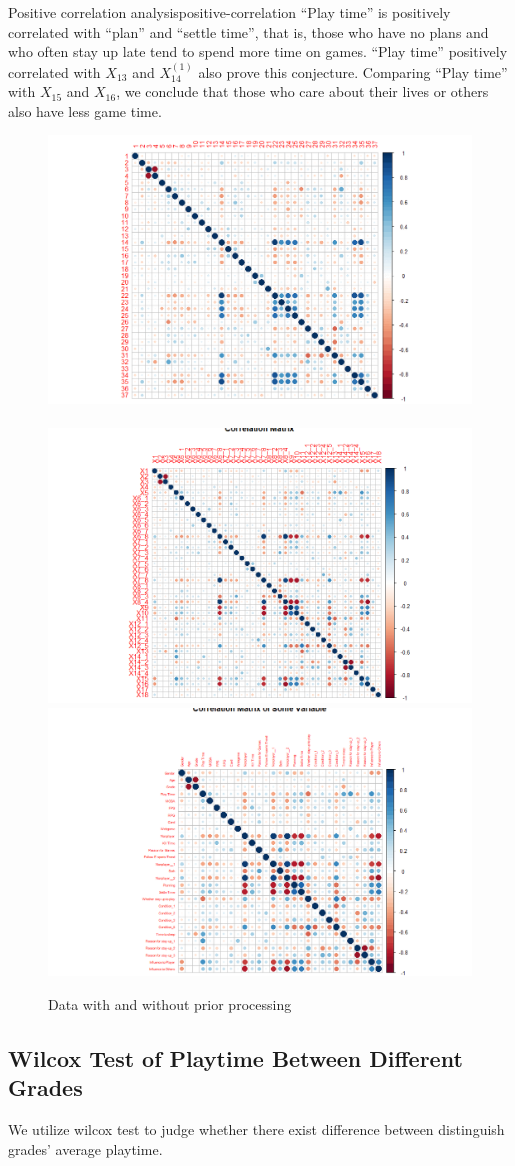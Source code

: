 \documentclass[scheme=plain]{ctexart}
\begin{document}
\begin{analysis}{Positive correlation analysis}{positive-correlation}
``Play time'' is positively correlated with ``plan'' and ``settle time'', that is, those who have no plans and who often stay up late tend to spend more time on games. ``Play time'' positively correlated with $X_{13}$ and $X_{14}^{(1)}$ also prove this conjecture. Comparing ``Play time'' with $X_{15}$ and $X_{16}$, we conclude that those who care about their lives or others also have less game time.
\end{analysis}

\begin{figure}[H]
    \centering
        {\includegraphics[width=.45\textwidth]{4}}
    $\quad$
        {\includegraphics[width=.45\textwidth]{5}} \\
        {\includegraphics[width=.45\textwidth]{6}}
    \caption{Data with and without prior processing}\label{F:Data-3}
\end{figure}


\subsection{Wilcox Test of Playtime Between Different Grades}
We utilize wilcox test to judge whether there exist difference between distinguish grades' average playtime.
\end{document}
